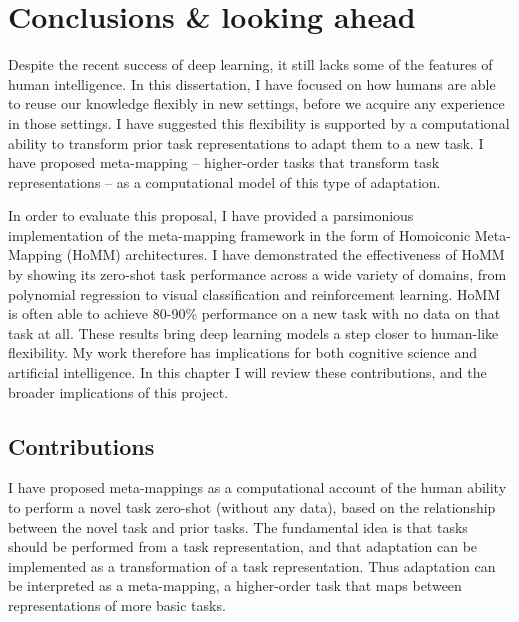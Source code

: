 \chapter{Conclusions \& looking ahead} \label{chapter:conclusions}

Despite the recent success of deep learning, it still lacks some of the features of human intelligence. In this dissertation, I have focused on how humans are able to reuse our knowledge flexibly in new settings, before we acquire any experience in those settings. I have suggested this flexibility is supported by a computational ability to transform prior task representations to adapt them to a new task. I have proposed meta-mapping -- higher-order tasks that transform task representations -- as a computational model of this type of adaptation. \par
In order to evaluate this proposal, I have provided a parsimonious implementation of the meta-mapping framework in the form of Homoiconic Meta-Mapping (HoMM) architectures. I have demonstrated the effectiveness of HoMM by showing its zero-shot task performance across a wide variety of domains, from polynomial regression to visual classification and reinforcement learning. HoMM is often able to achieve 80-90\% performance on a new task with no data on that task at all. These results bring deep learning models a step closer to human-like flexibility. My work therefore has implications for both cognitive science and artificial intelligence. In this chapter I will review these contributions, and the broader implications of this project. \par  

\section{Contributions}

I have proposed meta-mappings as a computational account of the human ability to perform a novel task zero-shot (without any data), based on the relationship between the novel task and prior tasks. The fundamental idea is that tasks should be performed from a task representation, and that adaptation can be implemented as a transformation of a task representation. Thus adaptation can be interpreted as a meta-mapping, a higher-order task that maps between representations of more basic tasks. \par  


